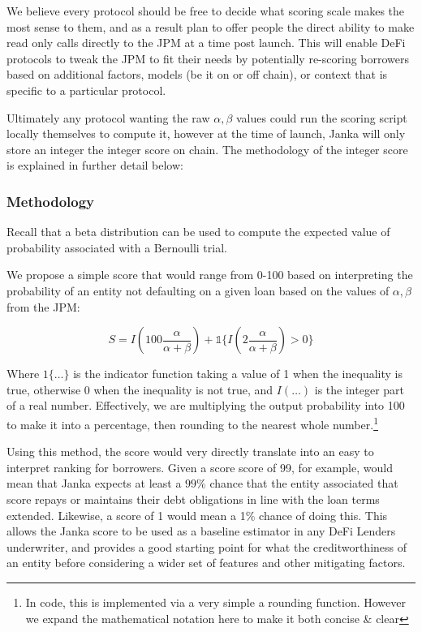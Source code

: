 \documentclass{article}
\begin{document}
We believe every protocol should be free to decide what scoring scale makes the most sense to them, and as a result plan to offer people the direct ability to make read only calls directly to the JPM at a time post launch. This will enable DeFi protocols to tweak the JPM to fit their needs by potentially re-scoring borrowers based on additional factors, models (be it on or off chain), or context that is specific to a particular protocol. 

Ultimately any protocol wanting the raw $\alpha,\beta$ values could run the scoring script locally themselves to compute it, however at the time of launch, Janka will only store an integer the integer score on chain. The methodology of the integer score is explained in further detail below:

\subsubsection{Methodology}

Recall that a beta distribution can be used to compute the expected value of probability associated with a Bernoulli trial. 

We propose a simple score that would range from 0-100 based on interpreting the probability of an entity not defaulting on a given loan based on the values of $\alpha, \beta$ from the JPM:

\begin{equation}
S = I(100\frac{\alpha}{\alpha + \beta}) + \mathbb{1}\{ I(2\frac{\alpha}{\alpha+\beta}) > 0\}
\end{equation}

Where $1\{\dots\}$ is the indicator function taking a value of 1 when the inequality is true, otherwise 0 when the inequality is not true, and $I(\dots)$ is the integer part of a real number. Effectively, we are multiplying the output probability into 100 to make it into a percentage, then rounding to the nearest whole number.\footnote{In code, this is implemented via a very simple a rounding function. However we expand the mathematical notation here to make it both concise \& clear}

Using this method, the score would very directly translate into an easy to interpret ranking for borrowers. Given a score score of 99, for example, would mean that Janka expects at least a $99\%$ chance that the entity associated that score repays or maintains their debt obligations in line with the loan terms extended. Likewise, a score of 1 would mean a 1$\%$ chance of doing this. This allows the Janka score to be used as a baseline estimator in any DeFi Lenders underwriter, and provides a good starting point for what the creditworthiness of an entity before considering a wider set of features and other mitigating factors.
\end{document}
